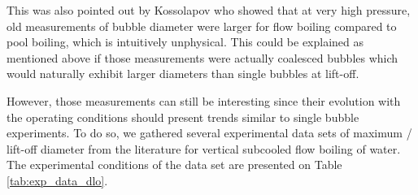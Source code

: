 \npar

This was also pointed out by Kossolapov \cite{kossolapov_experimental_2021} who showed that at very high pressure, old measurements of bubble diameter were larger for flow boiling compared to pool boiling, which is intuitively unphysical. This could be explained as mentioned above if those measurements were actually coalesced bubbles which would naturally exhibit larger diameters than single bubbles at lift-off.  

\npar

However, those measurements can still be interesting since their evolution with the operating conditions should present trends similar to single bubble experiments. To do so, we gathered several experimental data sets of maximum / lift-off diameter from the literature for vertical subcooled flow boiling of water. The experimental conditions of the data set are presented on Table \ref{tab:exp_data_dlo}.



